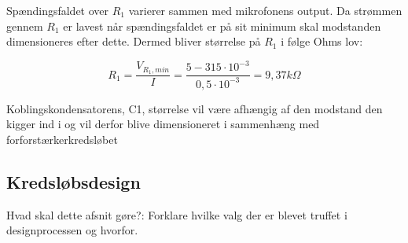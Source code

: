 Spændingsfaldet over $R_1$ varierer sammen med mikrofonens output. Da strømmen gennem $R_1$ er lavest når spændingsfaldet er på sit minimum skal modstanden dimensioneres efter dette. Dermed bliver størrelse på $R_1$ i følge Ohms lov:

\begin{equation}
R_1 =  \frac{V_{R_1,min}}{I} = \frac{5-315 \cdot 10^{-3}}{0,5 \cdot 10^{-3}} = 9,37 k\Omega
\end{equation}

Koblingskondensatorens, C1, størrelse vil være afhængig af den modstand den kigger ind i og vil derfor blive dimensioneret i sammenhæng med forforstærkerkredsløbet 

\subsection*{Kredsløbsdesign}

Hvad skal dette afsnit gøre?:
Forklare hvilke valg der er blevet truffet i designprocessen og hvorfor.



